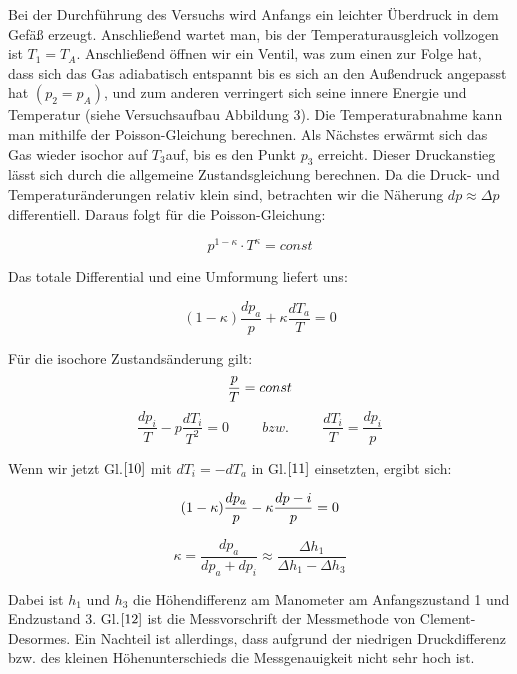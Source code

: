 \documentclass{article}
\begin{document}
{Bei der Durchführung des Versuchs wird Anfangs ein leichter Überdruck in dem Gefäß erzeugt. Anschließend wartet man, bis der Temperaturausgleich vollzogen ist \(T_{1}=T_{A}\). Anschließend öffnen wir ein Ventil, was zum einen zur Folge hat, dass sich das Gas adiabatisch entspannt bis es sich an den Außendruck angepasst hat \((p_{2} = p_{A})\), und zum anderen verringert sich seine innere Energie und Temperatur (siehe Versuchsaufbau Abbildung 3). Die Temperaturabnahme kann man mithilfe der {\sc Poisson-Gleichung} berechnen. Als Nächstes erwärmt sich das Gas wieder isochor auf \(T_{3}\)auf, bis es den Punkt \(p_{3}\) erreicht. Dieser Druckanstieg lässt sich durch die allgemeine Zustandsgleichung berechnen. Da die Druck- und Temperaturänderungen relativ klein sind, betrachten wir die Näherung \(dp\approx \Delta p\) differentiell. Daraus folgt für die {\sc Poisson-Gleichung}:

\begin{equation}
p^{1-\kappa }\cdot T^\kappa =const
\end{equation}

Das totale Differential und eine Umformung liefert uns:

\begin{equation}
\label{10}
(1-\kappa )\frac{dp_{a}}{p}+\kappa \frac{dT_{a}}{T}=0
\end{equation}

Für die isochore Zustandsänderung gilt:
\begin{equation}
\label{11}
\frac{p}{T}=const \notag
\end{equation}
\begin{equation}
\frac{dp_{i}}{T}-p \frac{dT_{i}}{T^2}=0 \hspace{1cm} bzw. \hspace{1cm} \frac{dT_{i}}{T}=\frac{dp_{i}}{p}
\end{equation}

Wenn wir jetzt Gl.\(\eqref{10}\) mit \(dT_{i}=-dT_{a}\) in Gl.\(\eqref{11}\) einsetzten, ergibt sich:

\begin{equation}
(1-\kappa ) \frac{dp_{a}}{p}-\kappa \frac{dp-{i}}{p}=0 \notag
\end{equation}

\begin{equation}
\label{kappa}
\kappa =\frac{dp_{a}}{dp_{a}+dp_{i}}\approx \frac{\Delta h_{1}}{\Delta h_{1}-\Delta h_{3}}
\end{equation}

Dabei ist \(h_{1}\) und \(h_{3}\) die Höhendifferenz am Manometer am Anfangszustand 1 und Endzustand 3. Gl.\(\eqref{12}\) ist die Messvorschrift der Messmethode von Clement-Desormes. Ein Nachteil ist allerdings, dass aufgrund der niedrigen Druckdifferenz bzw. des kleinen Höhenunterschieds die Messgenauigkeit nicht sehr hoch ist.

}
\end{document}
